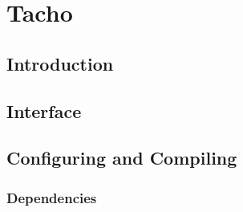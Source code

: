 \chapter{Tacho}
\label{C:Tacho}


\section{Introduction}\label{S:Tacho:Introduction}

\section{Interface}\label{S:Tacho:Interface}

\section{Configuring and Compiling}\label{S::Tacho:Config}

\subsection{Dependencies}

